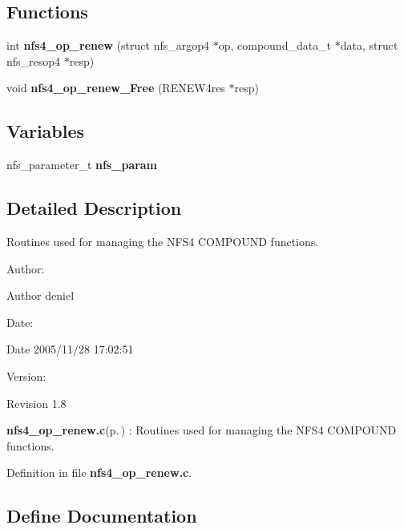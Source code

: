 \subsection*{Functions}
\begin{CompactItemize}
\item 
int {\bf nfs4\_\-op\_\-renew} (struct nfs\_\-argop4 $\ast$op, compound\_\-data\_\-t $\ast$data, struct nfs\_\-resop4 $\ast$resp)
\item 
void {\bf nfs4\_\-op\_\-renew\_\-Free} (RENEW4res $\ast$resp)
\end{CompactItemize}
\subsection*{Variables}
\begin{CompactItemize}
\item 
nfs\_\-parameter\_\-t {\bf nfs\_\-param}
\end{CompactItemize}


\subsection{Detailed Description}
Routines used for managing the NFS4 COMPOUND functions. 

\begin{Desc}
\item[Author:]\begin{Desc}
\item[Author]deniel \end{Desc}
\end{Desc}
\begin{Desc}
\item[Date:]\begin{Desc}
\item[Date]2005/11/28 17:02:51 \end{Desc}
\end{Desc}
\begin{Desc}
\item[Version:]\begin{Desc}
\item[Revision]1.8 \end{Desc}
\end{Desc}
{\bf nfs4\_\-op\_\-renew.c}{\rm (p.\,\pageref{nfs4__op__renew_8c})} : Routines used for managing the NFS4 COMPOUND functions.

Definition in file {\bf nfs4\_\-op\_\-renew.c}.

\subsection{Define Documentation}
